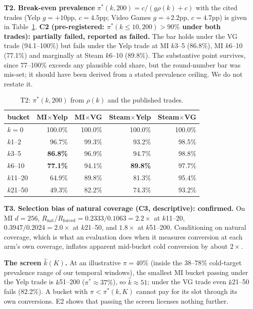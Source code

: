 \documentclass[sigconf,anonymous,review]{acmart}
\begin{document}
\textbf{T2. Break-even prevalence} $\pi^*(k,200)=c/(g\rho(k)+c)$ with the cited trades (Yelp $g{=}{+}10$pp, $c{=}4.5$pp; Video Games $g{=}{+}2.2$pp, $c{=}4.7$pp) is given in Table~\ref{tab:t2}. \textbf{C2 (pre-registered: $\pi^*(k\le 10,200)>90\%$ under both trades): partially failed, reported as failed.} The bar holds under the VG trade (94.1--100\%) but fails under the Yelp trade at MI $k$3--5 (86.8\%), MI $k$6--10 (77.1\%) and marginally at Steam $k$6--10 (89.8\%). The substantive point survives, since 77--100\% exceeds any plausible cold share, but the round-number bar was mis-set; it should have been derived from a stated prevalence ceiling. We do not restate it.

\begin{table}[t]
\caption{T2: $\pi^*(k,200)$ from $\rho(k)$ and the published trades.}
\label{tab:t2}
\small
\begin{tabular}{lrrrr}
\toprule
bucket & MI$\times$Yelp & MI$\times$VG & Steam$\times$Yelp & Steam$\times$VG\\
\midrule
$k{=}0$ & 100.0\% & 100.0\% & 100.0\% & 100.0\%\\
$k$1--2 & 96.7\% & 99.3\% & 93.2\% & 98.5\%\\
$k$3--5 & \textbf{86.8\%} & 96.9\% & 94.7\% & 98.8\%\\
$k$6--10 & \textbf{77.1\%} & 94.1\% & \textbf{89.8\%} & 97.7\%\\
$k$11--20 & 64.9\% & 89.8\% & 81.3\% & 95.4\%\\
$k$21--50 & 49.3\% & 82.2\% & 74.3\% & 93.2\%\\
\bottomrule
\end{tabular}
\end{table}

\textbf{T3. Selection bias of natural coverage (C3, descriptive): confirmed.} On MI $d{=}256$, $R_{\mathrm{nat}}/R_{\mathrm{forced}}=0.2333/0.1063=2.2\times$ at $k$11--20, $0.3947/0.2024=2.0\times$ at $k$21--50, and $1.8\times$ at $k$51--200. Conditioning on natural coverage, which is what an evaluation does when it measures conversion at each arm's own coverage, inflates apparent mid-bucket cold conversion by about $2\times$.

\textbf{The screen $\hat k(K)$.} At an illustrative $\pi=40\%$ (inside the 38--78\% cold-target prevalence range of our temporal windows), the smallest MI bucket passing under the Yelp trade is $k$51--200 ($\pi^*\approx 37\%$), so $\hat k\approx 51$; under the VG trade even $k$21--50 fails (82.2\%). A bucket with $\pi<\pi^*(k,K)$ cannot pay for its slot through its own conversions. E2 shows that passing the screen licenses nothing further.
\end{document}
